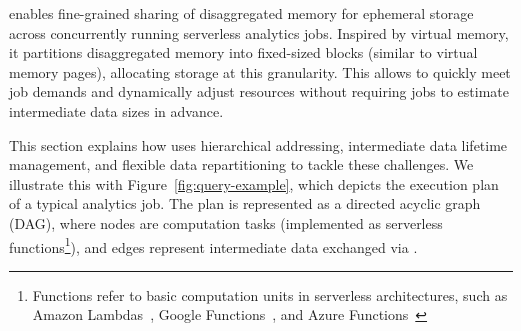 \jiffy enables fine-grained sharing of disaggregated memory for ephemeral storage across concurrently running serverless analytics jobs. Inspired by virtual memory, it partitions disaggregated memory into fixed-sized blocks (similar to virtual memory pages), allocating storage at this granularity. This allows \jiffy to quickly meet job demands and dynamically adjust resources without requiring jobs to estimate intermediate data sizes in advance.


This section explains how \jiffy uses hierarchical addressing, intermediate data lifetime management, and flexible data repartitioning to tackle these challenges. We illustrate this with Figure~\ref{fig:query-example}, which depicts the execution plan of a typical analytics job. The plan is represented as a directed acyclic graph (DAG), where nodes are computation tasks (implemented as serverless functions\footnote{Functions refer to basic computation units in serverless architectures, such as Amazon Lambdas~\cite{alambda}, Google Functions~\cite{googlefunctions}, and Azure Functions~\cite{azureFunctions}}), and edges represent intermediate data exchanged via \jiffy.


